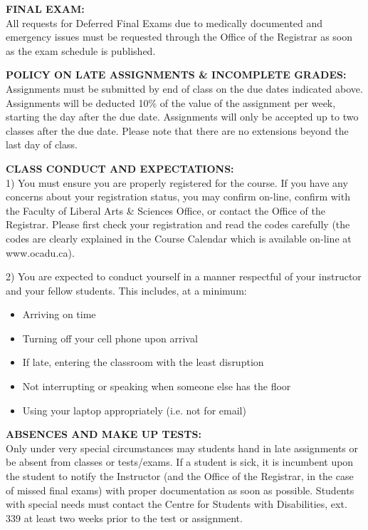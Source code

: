 \documentclass[10pt]{article}
\begin{document}
\textbf{FINAL EXAM:}\\
All requests for Deferred Final Exams due to medically documented and emergency issues must be requested through the Office of the Registrar as soon as the exam schedule is published.

\textbf{POLICY ON LATE ASSIGNMENTS \& INCOMPLETE GRADES:}\\
Assignments must be submitted by end of class on the due dates indicated above. Assignments will be deducted 10\% of the value of the assignment per week, starting the day after the due date. Assignments will only be accepted up to two classes after the due date. Please note that there are no extensions beyond the last day of class.

\textbf{CLASS CONDUCT AND EXPECTATIONS:}\\
1) You must ensure you are properly registered for the course. If you have any concerns about your registration status, you may confirm on-line, confirm with the Faculty of Liberal Arts \& Sciences Office, or contact the Office of the Registrar. Please first check your registration and read the codes carefully (the codes are clearly explained in the Course Calendar which is available on-line at www.ocadu.ca).

2) You are expected to conduct yourself in a manner respectful of your instructor and your fellow students. This includes, at a minimum:
\begin{itemize}
	\item Arriving on time
	\item Turning off your cell phone upon arrival
	\item If late, entering the classroom with the least disruption
	\item Not interrupting or speaking when someone else has the floor
	\item Using your laptop appropriately (i.e. not for email)
\end{itemize}

\textbf{ABSENCES AND MAKE UP TESTS:}\\
Only under very special circumstances may students hand in late assignments or be absent from classes or tests/exams. If a student is sick, it is incumbent upon the student to notify the Instructor (and the Office of the Registrar, in the case of missed final exams) with proper documentation as soon as possible.  Students with special needs must contact the Centre for Students with Disabilities, ext. 339 at least two weeks prior to the test or assignment.
\end{document}
